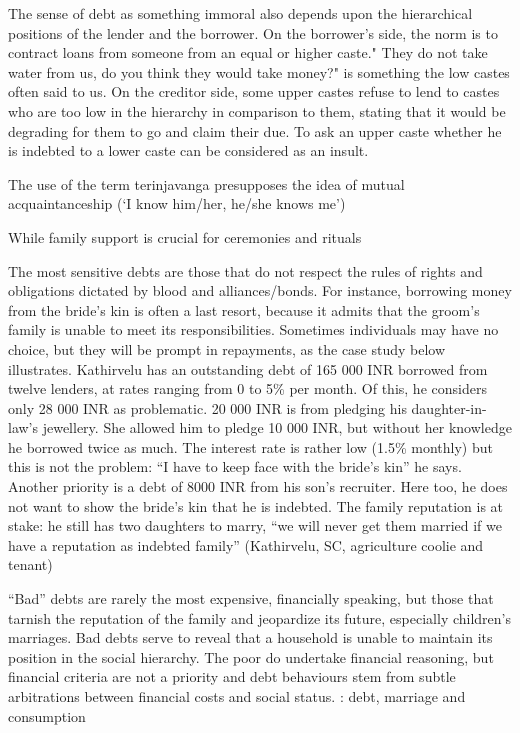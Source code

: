 \documentclass[a4paper, 11pt, onecolumn]{article}
\begin{document}
The sense of debt as something immoral also depends upon the hierarchical positions of the
lender and the borrower. On the borrower’s side, the norm is to contract loans from someone
from an equal or higher caste." They do not take water from us, do you think they would take
money?" is something the low castes often said to us. On the creditor side, some upper castes
refuse to lend to castes who are too low in the hierarchy in comparison to them, stating that it
would be degrading for them to go and claim their due. To ask an upper caste whether he is
indebted to a lower caste can be considered as an insult.

The use of the term terinjavanga presupposes the idea of mutual
acquaintanceship (‘I know him/her, he/she knows me’)

While family support is crucial for
ceremonies and rituals

The most sensitive debts are those that do not respect the rules of rights and
obligations dictated by blood and alliances/bonds. For instance, borrowing money
from the bride’s kin is often a last resort, because it admits that the groom’s family is
unable to meet its responsibilities. Sometimes individuals may have no choice, but they
will be prompt in repayments, as the case study below illustrates.
Kathirvelu has an outstanding debt of 165 000 INR borrowed from twelve lenders, at rates ranging from 0 to
5\% per month. Of this, he considers only 28 000 INR as problematic. 20 000 INR is from pledging his
daughter-in-law’s jewellery. She allowed him to pledge 10 000 INR, but without her knowledge he
borrowed twice as much. The interest rate is rather low (1.5\% monthly) but this is not the problem: “I have
to keep face with the bride’s kin” he says. Another priority is a debt of 8000 INR from his son’s recruiter.
Here too, he does not want to show the bride’s kin that he is indebted. The family reputation is at stake: he
still has two daughters to marry, “we will never get them married if we have a reputation as indebted
family” (Kathirvelu, SC, agriculture coolie and tenant)

“Bad” debts are
rarely the most expensive, financially speaking, but those that tarnish the reputation of the
family and jeopardize its future, especially children’s marriages. Bad debts serve to reveal that a household is unable to maintain its position in the social hierarchy. The poor do
undertake financial reasoning, but financial criteria are not a priority and debt behaviours
stem from subtle arbitrations between financial costs and social status.
\cite{James2020} : debt, marriage and consumption
\end{document}
